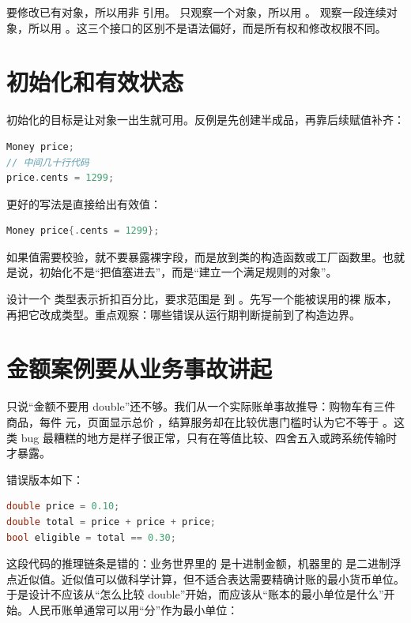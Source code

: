  要修改已有对象，所以用非  引用。 只观察一个对象，所以用 。 观察一段连续对象，所以用 。这三个接口的区别不是语法偏好，而是所有权和修改权限不同。

\section{初始化和有效状态}

初始化的目标是让对象一出生就可用。反例是先创建半成品，再靠后续赋值补齐：

\begin{lstlisting}[language=C++,caption={半成品对象容易被提前使用}]
Money price;
// 中间几十行代码
price.cents = 1299;
\end{lstlisting}

更好的写法是直接给出有效值：

\begin{lstlisting}[language=C++,caption={直接构造有效值}]
Money price{.cents = 1299};
\end{lstlisting}

如果值需要校验，就不要暴露裸字段，而是放到类的构造函数或工厂函数里。也就是说，初始化不是“把值塞进去”，而是“建立一个满足规则的对象”。

\begin{exercisebox}
设计一个  类型表示折扣百分比，要求范围是  到 。先写一个能被误用的裸  版本，再把它改成类型。重点观察：哪些错误从运行期判断提前到了构造边界。
\end{exercisebox}

\section{金额案例要从业务事故讲起}

只说“金额不要用 double”还不够。我们从一个实际账单事故推导：购物车有三件商品，每件  元，页面显示总价 ，结算服务却在比较优惠门槛时认为它不等于 。这类 bug 最糟糕的地方是样子很正常，只有在等值比较、四舍五入或跨系统传输时才暴露。

错误版本如下：

\begin{lstlisting}[language=C++,caption={金额浮点事故}]
double price = 0.10;
double total = price + price + price;
bool eligible = total == 0.30;
\end{lstlisting}

这段代码的推理链条是错的：业务世界里的  是十进制金额，机器里的  是二进制浮点近似值。近似值可以做科学计算，但不适合表达需要精确计账的最小货币单位。于是设计不应该从“怎么比较 double”开始，而应该从“账本的最小单位是什么”开始。人民币账单通常可以用“分”作为最小单位：


